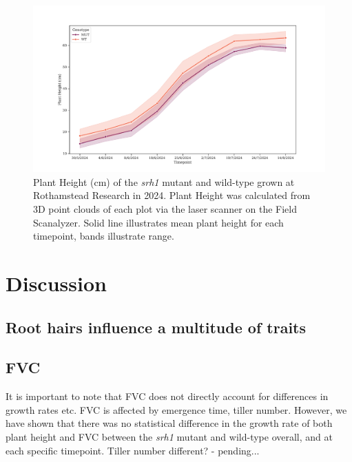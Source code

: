\documentclass{article}
\begin{document}
\begin{figure}[ht]
	\centering
	\includegraphics[width=\textwidth]{Height.pdf}
	\caption{Plant Height (cm) of the \textit{srh1} mutant and wild-type grown
		at Rothamstead Research in 2024. Plant Height was calculated from 3D point
		clouds of each plot via the laser scanner on the Field Scanalyzer. Solid
		line illustrates mean plant height for each timepoint, bands illustrate range.}
	\label{height}
\end{figure}


\section{Discussion}

\subsection{Root hairs influence a multitude of traits}







\subsection{FVC}
It is important to note that FVC does not directly account for differences
in growth rates etc. FVC is affected by emergence time, tiller number. However,
we have shown that there was no statistical difference in the growth rate of
both plant height and FVC between the \textit{srh1} mutant and wild-type overall,
and at each specific timepoint. Tiller number different? - pending...




\printbibliography
\end{document}
